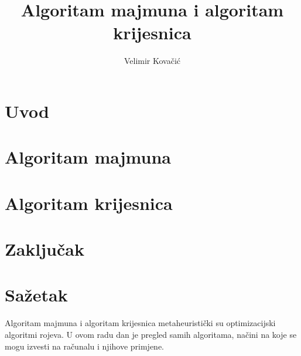 \documentclass[times, utf8, seminar]{fer}
\begin{document}
	
	\title{Algoritam majmuna i algoritam krijesnica}
	
	\author{Velimir Kovačić}
	
	
	\maketitle
	
	\tableofcontents
	
	\chapter{Uvod}
	

	\chapter{Algoritam majmuna}
	
	
	\chapter{Algoritam krijesnica}
	
	
	\chapter{Zaključak}
	
	
	
	
	\nocite{*}
	
	\chapter{Sažetak}
	Algoritam majmuna i algoritam krijesnica metaheuristički su optimizacijski algoritmi rojeva. U ovom radu dan je pregled samih algoritama, načini na koje se mogu izvesti na računalu i njihove primjene.
	
\end{document}
